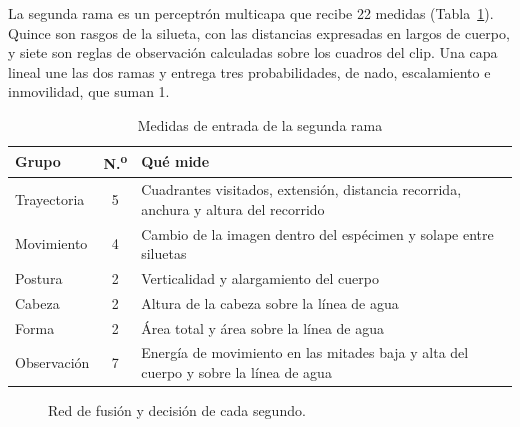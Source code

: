 \documentclass[conference,letterpaper]{IEEEtran}
\begin{document}
La segunda rama es un perceptrón multicapa que recibe 22 medidas
(Tabla~\ref{tab:medidas}). Quince son rasgos de la silueta, con las distancias expresadas en
largos de cuerpo, y siete son reglas de observación calculadas sobre los cuadros del clip.
Una capa lineal une las dos ramas y entrega tres probabilidades, de nado, escalamiento e
inmovilidad, que suman 1.

\begin{table}[t]
\renewcommand{\arraystretch}{1.15}
\caption{Medidas de entrada de la segunda rama}
\label{tab:medidas}
\centering
\footnotesize
\begin{tabular}{|l|c|p{4.7cm}|}
\hline
\textbf{Grupo} & \textbf{N.\textsuperscript{o}} & \textbf{Qué mide} \\
\hline
Trayectoria & 5 & Cuadrantes visitados, extensión, distancia recorrida, anchura y altura del recorrido \\
\hline
Movimiento & 4 & Cambio de la imagen dentro del espécimen y solape entre siluetas \\
\hline
Postura & 2 & Verticalidad y alargamiento del cuerpo \\
\hline
Cabeza & 2 & Altura de la cabeza sobre la línea de agua \\
\hline
Forma & 2 & Área total y área sobre la línea de agua \\
\hline
Observación & 7 & Energía de movimiento en las mitades baja y alta del cuerpo y sobre la línea de agua \\
\hline
\end{tabular}
\end{table}

\begin{figure}[t]
\centering
{}
\caption{Red de fusión y decisión de cada segundo.}
\label{fig:red}
\end{figure}
\end{document}

